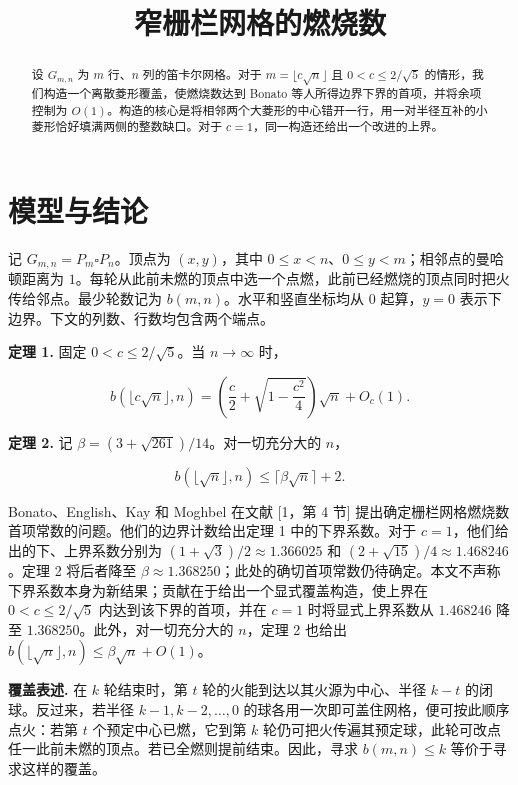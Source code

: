 \documentclass[UTF8,a4paper,11pt,fontset=fandol]{ctexart}
\title{窄栅栏网格的燃烧数}
\author{}
\date{}
\begin{document}
\maketitle

\begin{abstract}
设 $G_{m,n}$ 为 $m$ 行、$n$ 列的笛卡尔网格。对于 $m=\lfloor c\sqrt{n}\rfloor$ 且 $0<c\le 2/\sqrt{5}$ 的情形，我们构造一个离散菱形覆盖，使燃烧数达到 Bonato 等人所得边界下界的首项，并将余项控制为 $O(1)$。构造的核心是将相邻两个大菱形的中心错开一行，用一对半径互补的小菱形恰好填满两侧的整数缺口。对于 $c=1$，同一构造还给出一个改进的上界。
\end{abstract}

\section{模型与结论}

记 $G_{m,n}=P_m\square P_n$。顶点为 $(x,y)$，其中 $0\le x<n$、$0\le y<m$；相邻点的曼哈顿距离为 $1$。每轮从此前未燃的顶点中选一个点燃，此前已经燃烧的顶点同时把火传给邻点。最少轮数记为 $b(m,n)$。水平和竖直坐标均从 $0$ 起算，$y=0$ 表示下边界。下文的列数、行数均包含两个端点。

\textbf{定理 1.} 固定 $0<c\le 2/\sqrt{5}$。当 $n\to\infty$ 时，

\[
b(\lfloor c\sqrt{n}\rfloor,n)
=\left(\frac c2+\sqrt{1-\frac{c^2}{4}}\right)\sqrt{n}+O_c(1).
\]

\textbf{定理 2.} 记 $\beta=(3+\sqrt{261})/14$。对一切充分大的 $n$，

\[
b(\lfloor\sqrt{n}\rfloor,n)\le \lceil\beta\sqrt{n}\rceil+2.
\]

Bonato、English、Kay 和 Moghbel 在文献 [1，第 4 节] 提出确定栅栏网格燃烧数首项常数的问题。他们的边界计数给出定理 1 中的下界系数。对于 $c=1$，他们给出的下、上界系数分别为 $(1+\sqrt{3})/2\approx1.366025$ 和 $(2+\sqrt{15})/4\approx1.468246$。定理 2 将后者降至 $\beta\approx1.368250$；此处的确切首项常数仍待确定。本文不声称下界系数本身为新结果；贡献在于给出一个显式覆盖构造，使上界在 $0<c\le 2/\sqrt{5}$ 内达到该下界的首项，并在 $c=1$ 时将显式上界系数从 $1.468246$ 降至 $1.368250$。此外，对一切充分大的 $n$，定理 2 也给出 $b(\lfloor\sqrt{n}\rfloor,n)\le \beta\sqrt{n}+O(1)$。

\textbf{覆盖表述.} 在 $k$ 轮结束时，第 $t$ 轮的火能到达以其火源为中心、半径 $k-t$ 的闭球。反过来，若半径 $k-1,k-2,\ldots,0$ 的球各用一次即可盖住网格，便可按此顺序点火：若第 $t$ 个预定中心已燃，它到第 $k$ 轮仍可把火传遍其预定球，此轮可改点任一此前未燃的顶点。若已全燃则提前结束。因此，寻求 $b(m,n)\le k$ 等价于寻求这样的覆盖。
\end{document}
